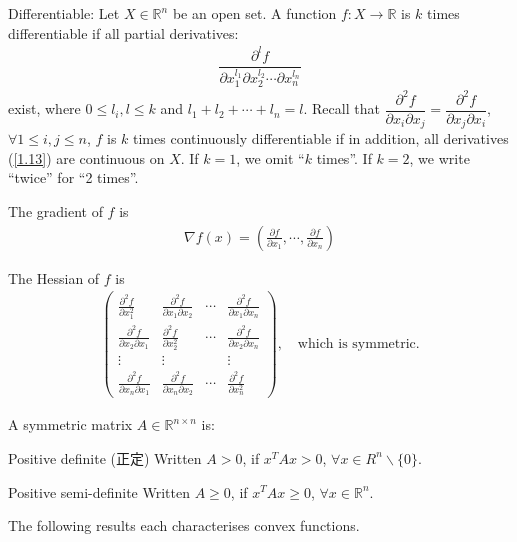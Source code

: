 \begin{definition}
    Differentiable: Let $X\in\mathbb{R}^n$ be an open set. A function $f:X\to\mathbb{R}$ is $k$ times differentiable if all partial derivatives:
    \begin{align}
        \dfrac{\partial^l f}{\partial x_1^{l_1} \partial x_2^{l_2}\cdots \partial x_n^{l_n}} \label{1.13}
    \end{align}
exist, where $0\le l_i, l\le k$ and $l_1+l_2+\cdots+l_n=l$. Recall that $\dfrac{\partial^2 f}{\partial x_i\partial x_j} = \dfrac{\partial^2 f}{\partial x_j\partial x_i}$, $\forall 1\le i, j\le n$, $f$ is $k$ times continuously differentiable if in addition, all derivatives (\ref{1.13}) are continuous on $X$. If $k=1$, we omit ``$k$ times''. If $k=2$, we write ``twice'' for ``2 times''.

The gradient of $f$ is
\begin{align*}
    \nabla f(x) = \left( \frac{\partial f}{\partial x_1}, \cdots , \frac{\partial f}{\partial x_n}\right)
\end{align*}

The Hessian of $f$ is
\begin{align*}
    \left(\begin{array}{cccc}
        \frac{\partial^2 f}{\partial x_1^2} & \frac{\partial^2 f}{\partial x_1\partial x_2} & \cdots & \frac{\partial^2 f}{\partial x_1\partial x_n} \\
        \frac{\partial^2 f}{\partial x_2\partial x_1} & \frac{\partial^2 f}{\partial x_2^2} & \cdots & \frac{\partial^2 f}{\partial x_2\partial x_n} \\
        \vdots & \vdots &  & \vdots \\
        \frac{\partial^2 f}{\partial x_n\partial x_1} & \frac{\partial^2 f}{\partial x_n\partial x_2} & \cdots & \frac{\partial^2 f}{\partial x_n^2} 
    \end{array}\right),\quad \text{which is symmetric.}
\end{align*}
\end{definition}

\begin{definition}
    A symmetric matrix $A\in\mathbb{R}^{n\times n}$ is:
    \item[Positive definite (正定)] Written $A>0$, if $x^TAx>0$, $\forall x\in R^n\backslash\{0\}$.
    \item[Positive semi-definite] Written $A\ge 0$, if $x^TAx\ge 0$, $\forall x\in \mathbb{R}^n$.

    The following results each characterises convex functions.
\end{definition}

